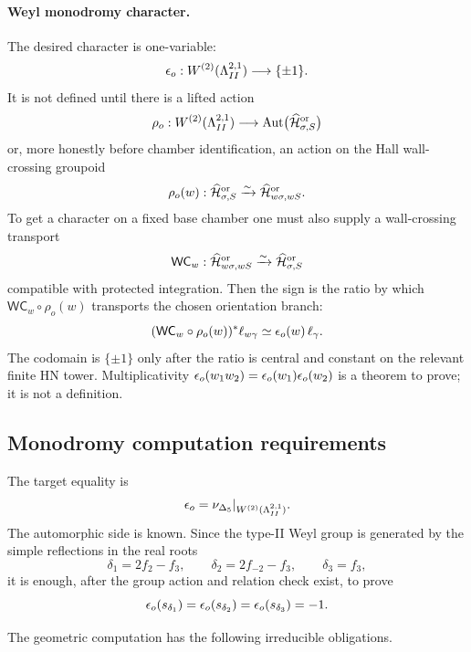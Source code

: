 \paragraph{Weyl monodromy character.}
The desired character is one-variable:
\[
  \epsilon_o:
  W^{(2)}(\Lambda^{2,1}_{II})\longrightarrow\{\pm1\}.
\]
It is not defined until there is a lifted action
\[
  \rho_o:
  W^{(2)}(\Lambda^{2,1}_{II})
  \longrightarrow
  \operatorname{Aut}
  \bigl(\widehat{\mathcal H}^{\mathrm{or}}_{\sigma,S}\bigr)
\]
or, more honestly before chamber identification, an action on the
Hall wall-crossing groupoid
\[
  \rho_o(w):
  \widehat{\mathcal H}^{\mathrm{or}}_{\sigma,S}
  \xrightarrow{\sim}
  \widehat{\mathcal H}^{\mathrm{or}}_{w\sigma,wS}.
\]
To get a character on a fixed base chamber one must also supply a
wall-crossing transport
\[
  \mathsf{WC}_w:
  \widehat{\mathcal H}^{\mathrm{or}}_{w\sigma,wS}
  \xrightarrow{\sim}
  \widehat{\mathcal H}^{\mathrm{or}}_{\sigma,S}
\]
compatible with protected integration.  Then the sign is the ratio by
which \(\mathsf{WC}_w\circ\rho_o(w)\) transports the chosen orientation
branch:
\[
  (\mathsf{WC}_w\circ\rho_o(w))^*\ell_{w\gamma}
  \simeq
  \epsilon_o(w)\,\ell_{\gamma}.
\]
The codomain is \(\{\pm1\}\) only after the ratio is central and
constant on the relevant finite HN tower.  Multiplicativity
\(\epsilon_o(w_1w_2)=\epsilon_o(w_1)\epsilon_o(w_2)\) is a theorem to prove; it is
not a definition.

\subsection{Monodromy computation requirements}

The target equality is
\[
  \epsilon_o
  =
  \nu_{\Delta_5}|_{W^{(2)}(\Lambda^{2,1}_{II})}.
\]
The automorphic side is known.  Since the type-II Weyl group is
generated by the simple reflections in the real roots
\[
  \delta_1=2f_2-f_3,\qquad
  \delta_2=2f_{-2}-f_3,\qquad
  \delta_3=f_3,
\]
it is enough, after the group action and relation check exist, to prove
\[
  \epsilon_o(s_{\delta_1})
  =
  \epsilon_o(s_{\delta_2})
  =
  \epsilon_o(s_{\delta_3})
  =
  -1.
\]

The geometric computation has the following irreducible obligations.

